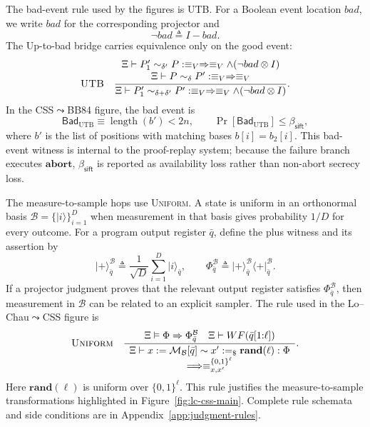 \documentclass[conference,compsoc]{IEEEtran}
\newenvironment{tightdisplay}{%
  \begingroup
  \setlength{\arraycolsep}{2pt}%
  \[
}{%
  \]
  \endgroup
}
\providecommand{\ket}[1]{\lvert #1\rangle}
\providecommand{\bra}[1]{\langle #1\rvert}
\newcommand{\bb}{\textsf{BB84}\xspace}
\begin{document}
The bad-event rule used by the figures is \textsc{UTB}. For a Boolean event
location \(bad\), we write \(bad\) for the corresponding projector and
\[
\neg bad\triangleq I-bad .
\]
The Up-to-bad bridge carries equivalence only on the good event:
\begin{tightdisplay}
\textsc{UTB}\quad
\frac{\begin{array}{c}
\Xi\vdash
P'_1\sim_{\delta'}P:\equiv_V\Rightarrow
\equiv_V\land(\neg bad\otimes I)\\
\Xi\vdash
P\sim_\delta P':\equiv_V\Rightarrow\equiv_V
\end{array}}
{\Xi\vdash
P'_1\sim_{\delta+\delta'}P':\equiv_V\Rightarrow
\equiv_V\land(\neg bad\otimes I)}.
\end{tightdisplay}
In the CSS\(\leadsto\)\bb figure, the bad event is
\[
\mathsf{Bad}_{\mathrm{UTB}}\equiv \operatorname{length}(b')<2n,
\qquad
\Pr[\mathsf{Bad}_{\mathrm{UTB}}]\le\beta_{\mathsf{sift}},
\]
where \(b'\) is the list of positions with matching bases \(b[i]=b_2[i]\).
This bad-event witness is internal to the proof-replay system; because the
failure branch executes \(\mathbf{abort}\), \(\beta_{\mathsf{sift}}\) is reported as
availability loss rather than non-abort secrecy loss.

The measure-to-sample hops use \textsc{Uniform}. A state is uniform in an
orthonormal basis \(\mathcal B=\{\ket i\}_{i=1}^{D}\) when measurement in that
basis gives probability \(1/D\) for every outcome. For a program output
register \(\bar q\), define the plus witness and its assertion by
\[
\ket{+}^{\mathcal B}_{\bar q}
\triangleq \frac1{\sqrt D}\sum_{i=1}^{D}\ket i_{\bar q},
\qquad
\Phi_{\bar q}^{\mathcal B}
\triangleq
\ket{+}^{\mathcal B}_{\bar q}\bra{+}^{\mathcal B}_{\bar q}.
\]
If a projector judgment proves that the relevant output register satisfies
\(\Phi_{\bar q}^{\mathcal B}\), then measurement in \(\mathcal B\) can be
related to an explicit sampler. The rule used in the Lo--Chau\(\leadsto\)CSS
figure is
\begin{tightdisplay}
\textsc{Uniform}\quad
\frac{\Xi\vDash\Phi\Rightarrow \Phi_{\bar q}^{\mathcal B}
\quad \Xi\vdash WF(\bar q[1{:}\ell])}
{\begin{array}{c}
\Xi\vdash
x:=\mathcal M_{\mathcal B}[\bar q]\sim
x':=_\$\mathbf{rand}(\ell):\Phi\\
\Longrightarrow \equiv^{\{0,1\}^{\ell}}_{x,x'}
\end{array}}.
\end{tightdisplay}
Here \(\mathbf{rand}(\ell)\) is uniform over \(\{0,1\}^{\ell}\). This rule justifies the measure-to-sample transformations highlighted in Figure~\ref{fig:lc-css-main}. Complete rule schemata and side conditions are in
Appendix~\ref{app:judgment-rules}.
\end{document}
